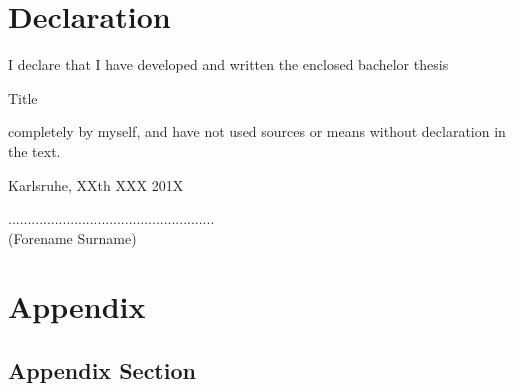 \documentclass[a4paper,12pt]{article}%
\begin{document}
\newpage
\section*{Declaration}

\vspace{2cm}
\begin{flushleft}
    I declare that I have developed and written the enclosed
    bachelor thesis\\[-0.3cm]
\end{flushleft}
\begin{center}
    {\large Title}\\[0.5cm]
\end{center}
    completely by myself, and have not used sources or means without
    declaration in the text.\\[2.5cm]

\begin{flushleft}
    Karlsruhe, XXth XXX 201X\\[0.1cm]
\end{flushleft}
\hspace*{9.0cm}.....................................................\\
\hspace*{10.1cm}(Forename Surname)

\newpage
{} \nocite{*}
%
%

%


\newpage
{} \nocite{*}
\section*{Appendix}
\renewcommand{\thesubsection}{\Alph{subsection}}
\subsection*{Appendix Section}

\newpage
\listoftodos[Todos]
\end{document}
